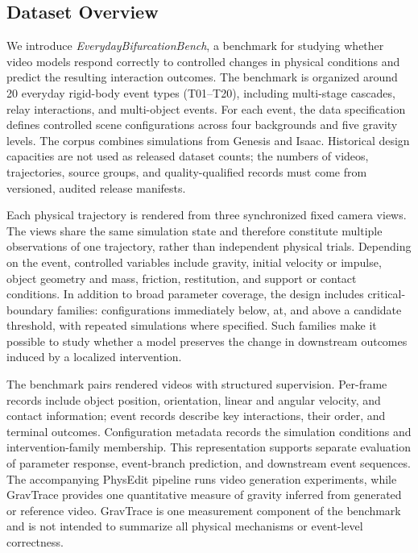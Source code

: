 \subsection{Dataset Overview}
\label{sec:dataset}

We introduce \textit{EverydayBifurcationBench}, a benchmark for studying
whether video models respond correctly to controlled changes in physical
conditions and predict the resulting interaction outcomes. The benchmark is
organized around 20 everyday rigid-body event types (T01--T20), including
multi-stage cascades, relay interactions, and multi-object events. For each
event, the data specification defines controlled scene configurations across
four backgrounds and five gravity levels. The corpus combines simulations
from Genesis and Isaac. Historical design capacities are not used as released
dataset counts; the numbers of videos, trajectories, source groups, and
quality-qualified records must come from versioned, audited release manifests.

Each physical trajectory is rendered from three synchronized fixed camera
views. The views share the same simulation state and therefore constitute
multiple observations of one trajectory, rather than independent physical
trials. Depending on the event, controlled variables include gravity,
initial velocity or impulse, object geometry and mass, friction, restitution,
and support or contact conditions. In addition to broad parameter coverage,
the design includes critical-boundary families: configurations immediately
below, at, and above a candidate threshold, with repeated simulations where
specified. Such families make it possible to study whether a model preserves
the change in downstream outcomes induced by a localized intervention.

The benchmark pairs rendered videos with structured supervision. Per-frame
records include object position, orientation, linear and angular velocity,
and contact information; event records describe key interactions, their
order, and terminal outcomes. Configuration metadata records the simulation
conditions and intervention-family membership. This representation supports
separate evaluation of parameter response, event-branch prediction, and
downstream event sequences. The accompanying PhysEdit pipeline runs video
generation experiments, while GravTrace provides one quantitative measure of
gravity inferred from generated or reference video. GravTrace is one
measurement component of the benchmark and is not intended to summarize all
physical mechanisms or event-level correctness.

